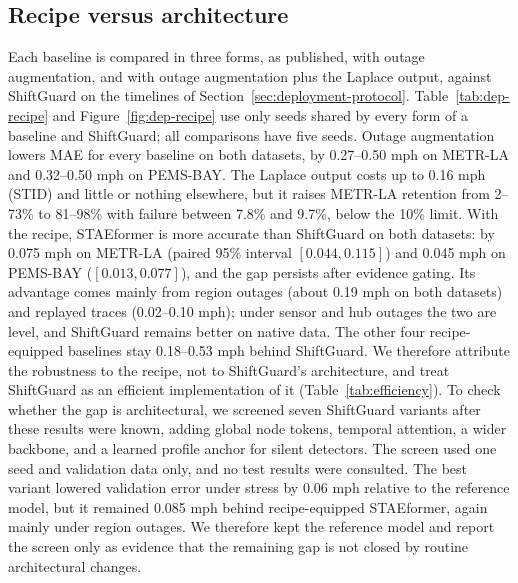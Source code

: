 \documentclass[preprint,12pt]{elsarticle}
\begin{document}
\subsection{Recipe versus architecture}
\label{sec:fair-comparison}
Each baseline is compared in three forms, as published, with outage augmentation,
and with outage augmentation plus the Laplace output, against ShiftGuard on the
timelines of Section~\ref{sec:deployment-protocol}.
Table~\ref{tab:dep-recipe} and Figure~\ref{fig:dep-recipe} use only seeds shared by
every form of a baseline and ShiftGuard; all comparisons have five seeds.
Outage augmentation lowers MAE for every baseline on both datasets, by 0.27--0.50 mph
on METR-LA and 0.32--0.50 mph on PEMS-BAY. The Laplace output costs up to 0.16 mph
(STID) and little or nothing elsewhere, but it raises METR-LA retention from
2--73\% to 81--98\% with failure between 7.8\% and 9.7\%, below the 10\% limit.
With the recipe, STAEformer is more accurate than ShiftGuard on both datasets: by
0.075 mph on METR-LA (paired 95\% interval $[0.044,0.115]$) and 0.045 mph on
PEMS-BAY ($[0.013,0.077]$), and the gap persists after evidence gating. Its
advantage comes mainly from region outages (about 0.19 mph on both datasets) and
replayed traces (0.02--0.10 mph); under sensor and hub outages the two are level,
and ShiftGuard remains better on native data. The other four recipe-equipped
baselines stay 0.18--0.53 mph behind ShiftGuard. We therefore attribute the
robustness to the recipe, not to ShiftGuard's architecture, and treat ShiftGuard as
an efficient implementation of it (Table~\ref{tab:efficiency}).
To check whether the gap is architectural, we screened seven ShiftGuard variants
after these results were known, adding global node tokens, temporal attention, a
wider backbone, and a learned profile anchor for silent detectors. The screen used
one seed and validation data only, and no test results were consulted. The best
variant lowered validation error under stress by 0.06 mph relative to the reference
model, but it remained 0.085 mph behind recipe-equipped STAEformer, again mainly
under region outages. We therefore kept the reference model and report the screen
only as evidence that the remaining gap is not closed by routine architectural
changes.
\begin{table}[t]
  \centering
  \caption{Recipe versus architecture, averaged over the five outage scenarios on
  seeds shared within each baseline. ``vs SG'' is MAE minus ShiftGuard's on those
  seeds; negative favors the baseline. Retained and failure are percentages.}
  \label{tab:dep-recipe}
  \resizebox{\textwidth}{!}{}
\end{table}
\end{document}
